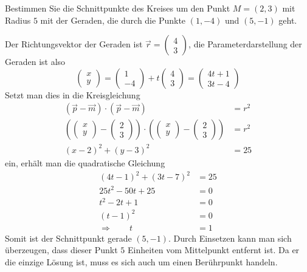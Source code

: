 Bestimmen Sie die Schnittpunkte des Kreises um den Punkt $M=(2,3)$
mit Radius $5$ mit der Geraden, die durch die Punkte $(1,-4)$
und $(5,-1)$ geht.


\begin{loesung}
Der Richtungsvektor der Geraden ist $\vec r=\begin{pmatrix}4\\3\end{pmatrix}$,
die Parameterdarstellung der Geraden ist also
\[
\begin{pmatrix}x\\y\end{pmatrix}
=
\begin{pmatrix}1\\-4\end{pmatrix}
+t
\begin{pmatrix}4\\3\end{pmatrix}
=
\begin{pmatrix}4t+1\\3t-4\end{pmatrix}
\]
Setzt man dies in die Kreisgleichung
\begin{align*}
(\vec p-\vec m)\cdot(\vec p-\vec m)&=r^2\\
\left(
\begin{pmatrix}x\\y\end{pmatrix}
-
\begin{pmatrix}2\\3\end{pmatrix}
\right)
\cdot
\left(
\begin{pmatrix}x\\y\end{pmatrix}
-
\begin{pmatrix}2\\3\end{pmatrix}
\right)
&=r^2
\\
(x-2)^2+(y-3)^2&=25
\end{align*}
ein, erhält man die quadratische Gleichung
\begin{align*}
(4t-1)^2+(3t-7)^2&=25
\\
25t^2-50t+25&=0
\\
t^2-2t+1&=0
\\
(t-1)^2&=0
\\
\Rightarrow\qquad t&=1
\end{align*}
Somit ist der Schnittpunkt gerade $(5,-1)$. Durch Einsetzen kann
man sich überzeugen, dass dieser Punkt $5$ Einheiten vom Mittelpunkt
entfernt ist. Da er die einzige Lösung ist, muss es sich auch um
einen Berührpunkt handeln.
\end{loesung}

